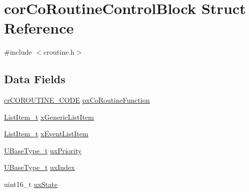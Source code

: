 \hypertarget{structcorCoRoutineControlBlock}{\section{cor\-Co\-Routine\-Control\-Block Struct Reference}
\label{structcorCoRoutineControlBlock}
}


{\ttfamily \#include $<$croutine.\-h$>$}

\subsection*{Data Fields}
\begin{DoxyCompactItemize}
\item 
\hyperlink{croutine_8h_a81f9a1d6fde40a7d4c9c2c8386c28d71}{cr\-C\-O\-R\-O\-U\-T\-I\-N\-E\-\_\-\-C\-O\-D\-E} \hyperlink{structcorCoRoutineControlBlock_acc98c7364cd88e8e034a5f9bba113832}{px\-Co\-Routine\-Function}
\item 
\hyperlink{list_8h_a1a62d469392f9bfe2443e7efab9c8398}{List\-Item\-\_\-t} \hyperlink{structcorCoRoutineControlBlock_aa2900494db8782eeb8ef12d482501406}{x\-Generic\-List\-Item}
\item 
\hyperlink{list_8h_a1a62d469392f9bfe2443e7efab9c8398}{List\-Item\-\_\-t} \hyperlink{structcorCoRoutineControlBlock_a105d316da0069f766acc3b210afed1b9}{x\-Event\-List\-Item}
\item 
\hyperlink{Flsh186_2prtmacro_8h_a8e88a5e44a5243b3d1c29af17fd6b5bd}{U\-Base\-Type\-\_\-t} \hyperlink{structcorCoRoutineControlBlock_a752101a5d41b5caa7fd5149436613c8f}{ux\-Priority}
\item 
\hyperlink{Flsh186_2prtmacro_8h_a8e88a5e44a5243b3d1c29af17fd6b5bd}{U\-Base\-Type\-\_\-t} \hyperlink{structcorCoRoutineControlBlock_a6c185cd2145f562fb570bea9b158fc81}{ux\-Index}
\item 
uint16\-\_\-t \hyperlink{structcorCoRoutineControlBlock_aa0d702ff5a23c61598fe13e5a78fb1dc}{ux\-State}
\end{DoxyCompactItemize}


